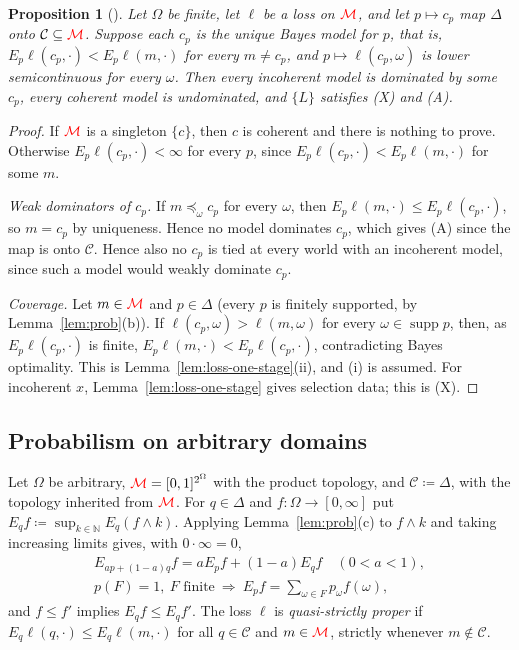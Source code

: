 \documentclass[11pt]{article}
\newcommand{\chg}[1]{{\color{red}#1}}
\newtheorem{proposition}[theorem]{Proposition}
\theoremstyle{definition}
\theoremstyle{remark}
\newcommand{\M}{\mathcal M}
\newcommand{\C}{\mathcal C}
\newcommand{\supp}{\operatorname{supp}}
\begin{document}
\begin{proposition}[{\cite{Predd2009,Pettigrew2022}}]\label{prop:proper}
Let $\Omega$ be finite, let $\ell$ be a loss on $\chg{\M}$, and let $p\mapsto c_p$ map $\Delta$ onto $\C\subseteq\chg{\M}$. Suppose each $c_p$ is the unique Bayes model for $p$, that is, $E_p\ell(c_p,\cdot)<E_p\ell(m,\cdot)$ for every $m\ne c_p$, and $p\mapsto\ell(c_p,\omega)$ is lower semicontinuous for every $\omega$. Then every incoherent model is dominated by some $c_p$, every coherent model is undominated, and $\{L\}$ satisfies \chg{(X) and (A)}.
\end{proposition}
\begin{proof}
If $\chg{\M}$ is a singleton $\{c\}$, then $c$ is coherent and there is nothing to prove. Otherwise $E_p\ell(c_p,\cdot)<\infty$ for every $p$, since $E_p\ell(c_p,\cdot)<E_p\ell(m,\cdot)$ for some $m$.

\emph{Weak dominators of $c_p$.} If $m\preceq_\omega c_p$ for every $\omega$, then $E_p\ell(m,\cdot)\le E_p\ell(c_p,\cdot)$, so $m=c_p$ by uniqueness. Hence no model dominates $c_p$, which gives (A) since the map is onto $\C$. Hence also no $c_p$ is tied at every world with an incoherent model, since such a model would weakly dominate $c_p$.

\emph{Coverage.} Let $m\in\chg{\M}$ and $p\in\Delta$ (every $p$ is finitely supported, by Lemma~\ref{lem:prob}(b)). If $\ell(c_p,\omega)>\ell(m,\omega)$ for every $\omega\in\supp p$, then, as $E_p\ell(c_p,\cdot)$ is finite, $E_p\ell(m,\cdot)<E_p\ell(c_p,\cdot)$, contradicting Bayes optimality. This is Lemma~\ref{lem:loss-one-stage}(ii), and (i) is assumed. For incoherent $x$, Lemma~\ref{lem:loss-one-stage} gives selection data; this is (X).
\end{proof}

\subsection{Probabilism on arbitrary domains}

Let $\Omega$ be arbitrary, $\chg{\M}=[0,1]^{2^\Omega}$ with the product topology, and $\C\coloneqq\Delta$, with the topology inherited from $\chg{\M}$. For $q\in\Delta$ and $f:\Omega\to[0,\infty]$ put $E_qf\coloneqq\sup_{k\in\mathbb N}E_q(f\wedge k)$. Applying Lemma~\ref{lem:prob}(c) to $f\wedge k$ and taking increasing limits gives, with $0\cdot\infty=0$,
\begin{gather*}
E_{ap+(1-a)q}f=aE_pf+(1-a)E_qf\quad(0<a<1),\\
p(F)=1,\ F\text{ finite}\ \Longrightarrow\ E_pf=\textstyle\sum_{\omega\in F}p_\omega f(\omega),
\end{gather*}
and $f\le f'$ implies $E_qf\le E_qf'$. The loss $\ell$ is \emph{quasi-strictly proper} if $E_q\ell(q,\cdot)\le E_q\ell(m,\cdot)$ for all $q\in\C$ and $m\in\chg{\M}$, strictly whenever $m\notin\C$.
\end{document}
